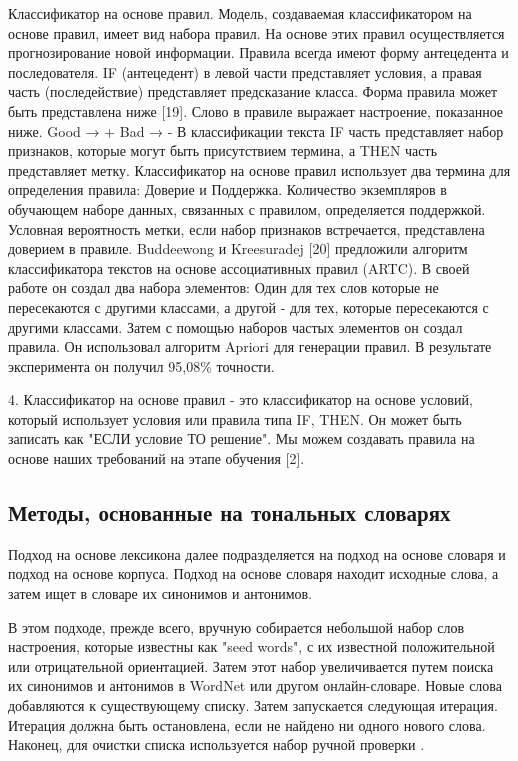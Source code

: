 Классификатор на основе правил. Модель, создаваемая классификатором на основе
правил, имеет вид набора правил. На основе этих правил осуществляется
прогнозирование новой информации. Правила всегда имеют форму антецедента и
последователя. IF (антецедент) в левой части представляет условия, а правая
часть (последействие) представляет предсказание класса. Форма правила может быть
представлена ниже [19].
Слово в правиле выражает настроение, показанное ниже.
{Good} → {+} {Bad} → {-}
В классификации текста IF часть представляет набор признаков, которые могут быть
присутствием термина, а THEN часть представляет метку. Классификатор на основе
правил использует два термина для определения правила: Доверие и Поддержка.
Количество экземпляров в обучающем наборе данных, связанных с правилом,
определяется поддержкой. Условная вероятность метки, если набор признаков
встречается, представлена доверием в правиле.  Buddeewong и Kreesuradej [20]
предложили алгоритм классификатора текстов на основе ассоциативных правил
(ARTC). В своей работе он создал два набора элементов: Один для тех слов которые
не пересекаются с другими классами, а другой - для тех, которые пересекаются с
другими классами. Затем с помощью наборов частых элементов он создал правила. Он
использовал алгоритм Apriori для генерации правил. В результате эксперимента он
получил 95,08\% точности.  \cite{article16}

4. Классификатор на основе правил - это классификатор на основе условий, который
использует условия или правила типа IF, THEN. Он может быть записать как "ЕСЛИ
условие ТО решение". Мы можем создавать правила на основе наших требований на
этапе обучения [2]. \cite{article18}

\subsection{Методы, основанные на тональных словарях}

Подход на основе лексикона далее подразделяется на подход на основе словаря и
подход на основе корпуса. Подход на основе словаря находит исходные слова, а
затем ищет в словаре их синонимов и антонимов.\cite{article2}

В этом подходе, прежде всего, вручную собирается небольшой набор слов
настроения, которые известны как "seed words", с их известной положительной или
отрицательной ориентацией. Затем этот набор увеличивается путем поиска их
синонимов и антонимов в WordNet или другом онлайн-словаре.  Новые слова
добавляются к существующему списку. Затем запускается следующая итерация.
Итерация должна быть остановлена, если не найдено ни одного нового слова.
Наконец, для очистки списка используется набор ручной проверки \cite{article4}.

